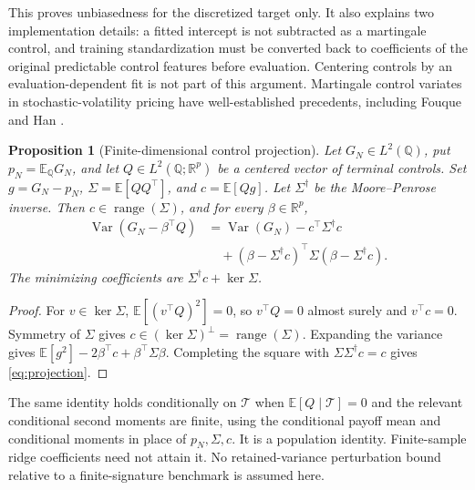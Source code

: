 \documentclass[11pt,a4paper]{article}
\numberwithin{equation}{section}
\newtheorem{proposition}[theorem]{Proposition}
\theoremstyle{definition}
\theoremstyle{remark}
\DeclareMathOperator{\Var}{Var}
\DeclareMathOperator{\range}{range}
\newcommand{\R}{\mathbb R}
\newcommand{\E}{\mathbb E}
\begin{document}
This proves unbiasedness for the discretized target only. It also explains
two implementation details: a fitted intercept is not subtracted as a
martingale control, and training standardization must be converted back to
coefficients of the original predictable control features before evaluation.
Centering controls by an evaluation-dependent fit is not part of this
argument. Martingale control variates in stochastic-volatility pricing have
well-established precedents, including Fouque and Han \cite{FouqueHan}.

\begin{proposition}[Finite-dimensional control projection]\label{prop:projection}
Let $G_N\in L^2(\mathbb Q)$, put $p_N=\E_{\mathbb Q}G_N$, and let
$Q\in L^2(\mathbb Q;\R^p)$ be a centered vector of terminal controls.
Set $g=G_N-p_N$, $\Sigma=\E[QQ^\top]$, and $c=\E[Qg]$.
Let $\Sigma^\dagger$ be the Moore--Penrose inverse. Then
$c\in\range(\Sigma)$, and for every $\beta\in\R^p$,
\begin{align}\label{eq:projection}
 \Var(G_N-\beta^\top Q)
 &=\Var(G_N)-c^\top\Sigma^\dagger c\nonumber\\
 &\quad +(\beta-\Sigma^\dagger c)^\top
 \Sigma(\beta-\Sigma^\dagger c).
\end{align}
The minimizing coefficients are $\Sigma^\dagger c+\ker\Sigma$.
\end{proposition}
\begin{proof}
For $v\in\ker\Sigma$, $\E[(v^\top Q)^2]=0$, so $v^\top Q=0$ almost
surely and $v^\top c=0$. Symmetry of $\Sigma$ gives
$c\in(\ker\Sigma)^\perp=\range(\Sigma)$. Expanding the variance gives
$\E[g^2]-2\beta^\top c+\beta^\top\Sigma\beta$. Completing the square
with $\Sigma\Sigma^\dagger c=c$ gives \eqref{eq:projection}.
\end{proof}
The same identity holds conditionally on $\mathcal T$ when
$\E[Q\mid\mathcal T]=0$ and the relevant conditional second moments are
finite, using the conditional payoff mean and conditional moments in
place of $p_N,\Sigma,c$. It is a population identity. Finite-sample
ridge coefficients need not attain it. No retained-variance perturbation
bound relative to a finite-signature benchmark is assumed here.
\end{document}

